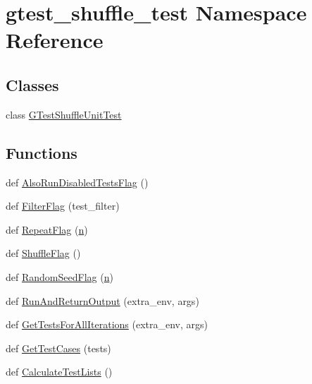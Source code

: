 \hypertarget{namespacegtest__shuffle__test}{}\section{gtest\+\_\+shuffle\+\_\+test Namespace Reference}
\label{namespacegtest__shuffle__test}
\subsection*{Classes}
\begin{DoxyCompactItemize}
\item 
class \hyperlink{classgtest__shuffle__test_1_1GTestShuffleUnitTest}{G\+Test\+Shuffle\+Unit\+Test}
\end{DoxyCompactItemize}
\subsection*{Functions}
\begin{DoxyCompactItemize}
\item 
def \hyperlink{namespacegtest__shuffle__test_a91033ae962b37f040a95fb90062aacb3}{Also\+Run\+Disabled\+Tests\+Flag} ()
\item 
def \hyperlink{namespacegtest__shuffle__test_aa849ecba21a2796be477040bd303b700}{Filter\+Flag} (test\+\_\+filter)
\item 
def \hyperlink{namespacegtest__shuffle__test_a193f6cd2eeb35e7925dca6d8f72f75d3}{Repeat\+Flag} (\hyperlink{app_2main_8cpp_acfc02ec89670db29251fda6a66602ce2}{n})
\item 
def \hyperlink{namespacegtest__shuffle__test_ab593e060bf2a9b2f0cb0dc8e18eb2088}{Shuffle\+Flag} ()
\item 
def \hyperlink{namespacegtest__shuffle__test_aaf2a94c748f266c4267ac7e7bb3451fd}{Random\+Seed\+Flag} (\hyperlink{app_2main_8cpp_acfc02ec89670db29251fda6a66602ce2}{n})
\item 
def \hyperlink{namespacegtest__shuffle__test_afbe879c2b3fdfed12b777b813359dbd4}{Run\+And\+Return\+Output} (extra\+\_\+env, args)
\item 
def \hyperlink{namespacegtest__shuffle__test_a18c7606bf0d41acb73a4a6a2994d36fc}{Get\+Tests\+For\+All\+Iterations} (extra\+\_\+env, args)
\item 
def \hyperlink{namespacegtest__shuffle__test_af5328e9cbee0e357d6abf16255df13f7}{Get\+Test\+Cases} (tests)
\item 
def \hyperlink{namespacegtest__shuffle__test_a51dcc55df3ebd76c676298ef9b4fea19}{Calculate\+Test\+Lists} ()
\end{DoxyCompactItemize}
